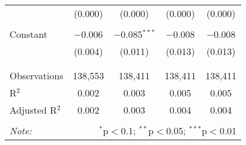 \begin{table}[!htbp]
\begin{tabular}{@{\extracolsep{-5pt}}lcccc}
  & (0.000) & (0.000) & (0.000) & (0.000) \\ 
  & & & & \\ 
 Constant & $-$0.006 & $-$0.085$^{***}$ & $-$0.008 & $-$0.008 \\ 
  & (0.004) & (0.011) & (0.013) & (0.013) \\ 
  & & & & \\ 
\hline \\[-1.8ex] 
Observations & 138,553 & 138,411 & 138,411 & 138,411 \\ 
R$^{2}$ & 0.002 & 0.003 & 0.005 & 0.005 \\ 
Adjusted R$^{2}$ & 0.002 & 0.003 & 0.004 & 0.004 \\ 
\hline 
\hline \\[-1.8ex] 
\textit{Note:}  & \multicolumn{4}{r}{$^{*}$p$<$0.1; $^{**}$p$<$0.05; $^{***}$p$<$0.01} \\ 
\end{tabular} 
\end{table} 
